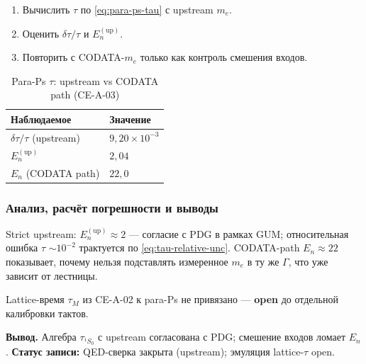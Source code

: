 \begin{enumerate}[label=\textbf{Шаг \arabic*:},leftmargin=*,itemsep=0.35em]
\item Вычислить $\tau$ по \eqref{eq:para-ps-tau} с upstream $m_e$.
\item Оценить $\delta\tau/\tau$ и $E_n^{(\mathrm{up})}$.
\item Повторить с CODATA-$m_e$ только как контроль смешения входов.
\end{enumerate}

\begin{table}[htbp]
\centering
\small
\caption{Para-Ps $\tau$: upstream vs CODATA path (CE-A-03)}
\label{tab:exp-ce-a-03}
\begin{tabular}{@{}ll@{}}
\toprule
Наблюдаемое & Значение \\
\midrule
$\delta\tau/\tau$ (upstream) & $9{,}20\times 10^{-3}$ \\
$E_n^{(\mathrm{up})}$ & $2{,}04$ \\
$E_n$ (CODATA path) & $22{,}0$ \\
\bottomrule
\end{tabular}
\end{table}

\subsubsection*{Анализ, расчёт погрешности и выводы}
Strict upstream: $E_n^{(\mathrm{up})}\approx 2$ --- согласие с PDG в рамках GUM; относительная ошибка $\tau$ $\sim 10^{-2}$ трактуется по \eqref{eq:tau-relative-unc}.
CODATA-path $E_n\approx 22$ показывает, почему нельзя подставлять измеренное $m_e$ в ту же $\Gamma$, что уже зависит от лестницы.

Lattice-время $\tau_M$ из CE-A-02 к para-Ps не привязано --- \textbf{open} до отдельной калибровки тактов.

\textbf{Вывод.}
Алгебра $\tau_{^1S_0}$ с upstream согласована с PDG; смешение входов ломает $E_n$.
\textbf{Статус записи:} QED-сверка закрыта (upstream); эмуляция lattice-$\tau$ open.
